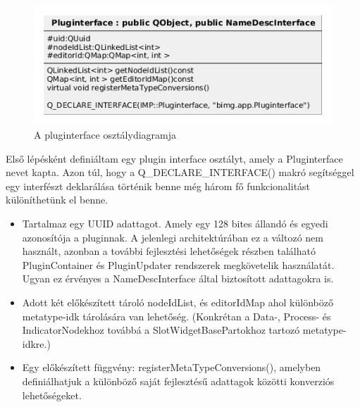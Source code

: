 \documentclass[a4paper,12pt,oneside]{report}
\begin{document}
\begin{center}
\begin{figure}[h]
  \includegraphics[width=1\textwidth]{pluginterface_diag.png}
  \caption{A pluginterface osztálydiagramja }

  \label{fig:bimg_slot_diag}
\end{figure}
\end{center}
Első lépésként definiáltam egy plugin interface osztályt, amely a Pluginterface nevet kapta. Azon túl, hogy a Q\_DECLARE\_INTERFACE() makró segítséggel egy interfészt deklarálása történik benne még három fő funkcionalitást különíthetünk el benne.
			\begin{itemize}
			\itemsep0em
			\item Tartalmaz egy UUID\cite{website:uuid_site} adattagot. Amely egy 128 bites állandó és egyedi azonosítója a pluginnak. A jelenlegi architektúrában ez a változó nem használt, azonban a további fejlesztési lehetőségek részben található PluginContainer és PluginUpdater rendszerek megkövetelik használatát. Ugyan ez érvényes a NameDescInterface által biztosított adattagokra is.
			\item Adott két előkészített tároló nodeIdList, és editorIdMap ahol különböző metatype-idk tárolására van lehetőség. (Konkrétan a Data-, Process- és IndicatorNodekhoz továbbá a SlotWidgetBasePartokhoz tartozó metatype-idkre.)
			\item Egy előkészített függvény: registerMetaTypeConversions(), amelyben definiálhatjuk a különböző saját fejlesztésű adattagok közötti konverziós lehetőségeket. 
		\end{itemize}
\end{document}
